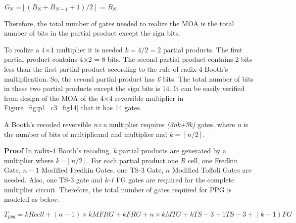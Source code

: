 \noindent \begin{center}
	\textit{G${}_{N}$} =$\left\lfloor (B_{N} +B_{N-1} +1)/2\right\rfloor $ = \textit{B${}_{N}$}
\end{center}

\noindent \begin{flushleft}
	
\end{flushleft}

\noindent Therefore, the total number of gates needed to realize the MOA is the total number of bits in the partial product except the sign bits.

\begin{example}\textnormal{
	To realize a {4$\times $4} multiplier it is needed $k=4/2=2$ partial products. The first partial product contains {4$\times $2 = 8} bits. The second partial product contains {2} bits less than the first partial product according to the rule of radix-4 Booth's multiplication. So, the second partial product has \textit{6} bits. The total number of bits in these two partial products except the sign bits is {14}. It can be easily verified from design of the MOA of the {4$\times $4} reversible multiplier in Figure~\ref{fig:p1_c3_fig14} that it has {14} gates.}
\end{example}

\begin{property}\label{p1_c3_p3}\textnormal{
	A Booth's recoded reversible \textit{n$\times $n }multiplier requires \textit{(3nk+9k) }gates, where \textit{n} is the number of bits of multiplicand and multiplier and \textit{k} = $\left\lceil n/2\right\rceil $.}
\end{property}

\noindent\textbf{Proof}
	In radix-4 Booth's recoding, \textit{k} partial products are generated by a multiplier where \textit{k} =$\left\lceil n/2\right\rceil $. For each partial product one \textit{R} cell, one Fredkin Gate, $n-1$ Modified Fredkin Gates, one TS-3 Gate, $n$ Modified Toffoli Gates are needed. Also, one TS-3 gate and \textit{k-1 }FG gates are required for the complete multiplier circuit. Therefore, the total number of gates required for PPG is modeled as below:

\begin{equation}\label{p1_c3_eqn1}
T{}_{ppg} = k R cell + (n-1)\times  k MFRG + k FRG + n\times k MTG + k TS-3 + 1 TS-3 + (k-1) FG
\end{equation}



